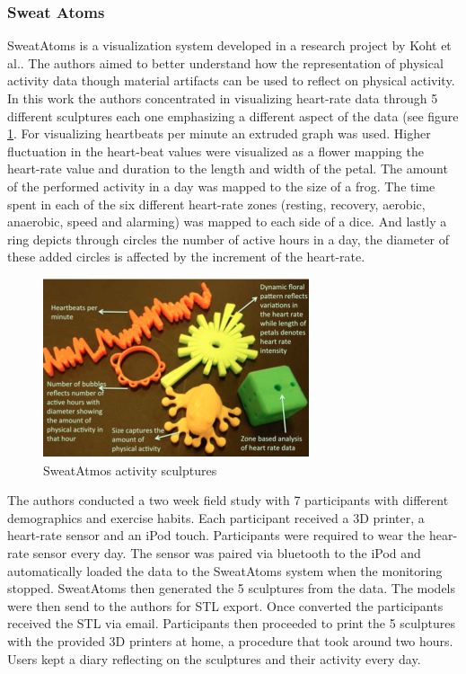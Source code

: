 \documentclass[../medieninformatik-arbeit.tex]{subfiles}
\begin{document}
\subsubsection{Sweat Atoms}
\label{sub:sweatatoms}
SweatAtoms is a visualization system developed in a research project by Koht et al.\cite{khot2014understanding}. The authors aimed to better understand how the representation of physical activity data though material artifacts can be used to reflect on physical activity. 
In this work the authors concentrated in visualizing heart-rate data through 5 different sculptures each one emphasizing a different aspect of the data (see figure \ref{fig:sweatatmos-as}. For visualizing heartbeats per minute an extruded graph was used. Higher fluctuation in the heart-beat values were visualized as a flower mapping the heart-rate value and duration to the length and width of the petal. The amount of the performed activity in a day was mapped to the size of a frog. The time spent in each of the six different heart-rate zones (resting, recovery, aerobic, anaerobic, speed and alarming) was mapped to each side of a dice. And lastly a ring depicts through circles the number of active hours in a day, the diameter of these added circles is affected by the increment of the heart-rate. 

\begin{figure}[ht]
\begin{center}
  \includegraphics[width=0.7\textwidth]{RelatedWork/img/sweatatoms-as}
  \caption{SweatAtmos activity sculptures\cite{khot2014understanding}}
\label{fig:sweatatmos-as}
\end{center}
\end{figure}

The authors conducted a two week field study with 7 participants with different demographics and exercise habits. Each participant received a 3D printer, a heart-rate sensor and an iPod touch. Participants were required to wear the hear-rate sensor every day. The sensor was paired via bluetooth to the iPod and automatically loaded the data to the SweatAtoms system when the monitoring stopped. SweatAtoms then generated the 5 sculptures from the data. The models were then send to the authors for STL export. Once converted the participants received the STL via email. Participants then proceeded to print the 5 sculptures with the provided 3D printers at home, a procedure that took around two hours. Users kept a diary reflecting on the sculptures and their activity every day. 
\end{document}
